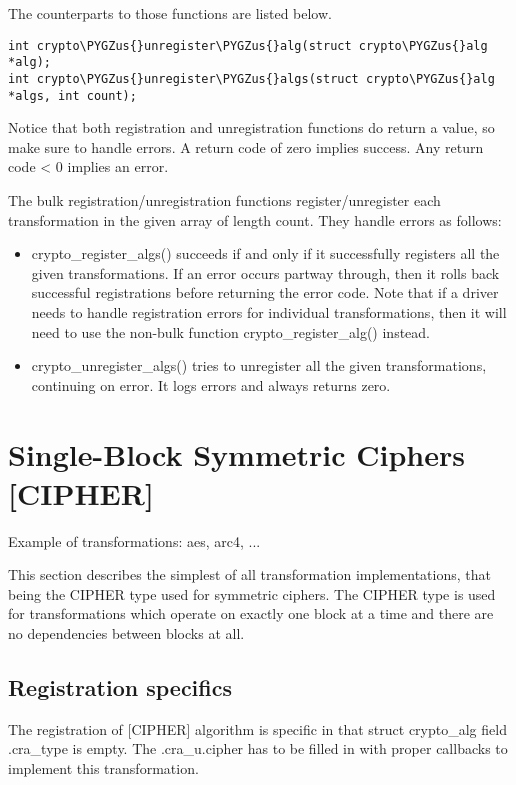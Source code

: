 \documentclass[a4paper,8pt,english]{sphinxmanual}
\def\PYGZus{\char`\_}
\begin{document}
The counterparts to those functions are listed below.

\begin{Verbatim}[commandchars=\\\{\}]
int crypto\PYGZus{}unregister\PYGZus{}alg(struct crypto\PYGZus{}alg *alg);
int crypto\PYGZus{}unregister\PYGZus{}algs(struct crypto\PYGZus{}alg *algs, int count);
\end{Verbatim}

Notice that both registration and unregistration functions do return a
value, so make sure to handle errors. A return code of zero implies
success. Any return code \textless{} 0 implies an error.

The bulk registration/unregistration functions register/unregister each
transformation in the given array of length count. They handle errors as
follows:
\begin{itemize}
\item {} 
crypto\_register\_algs() succeeds if and only if it successfully
registers all the given transformations. If an error occurs partway
through, then it rolls back successful registrations before returning
the error code. Note that if a driver needs to handle registration
errors for individual transformations, then it will need to use the
non-bulk function crypto\_register\_alg() instead.

\item {} 
crypto\_unregister\_algs() tries to unregister all the given
transformations, continuing on error. It logs errors and always
returns zero.

\end{itemize}


\section{Single-Block Symmetric Ciphers {[}CIPHER{]}}
\label{crypto/devel-algos:single-block-symmetric-ciphers-cipher}
Example of transformations: aes, arc4, ...

This section describes the simplest of all transformation
implementations, that being the CIPHER type used for symmetric ciphers.
The CIPHER type is used for transformations which operate on exactly one
block at a time and there are no dependencies between blocks at all.


\subsection{Registration specifics}
\label{crypto/devel-algos:registration-specifics}
The registration of {[}CIPHER{]} algorithm is specific in that struct
crypto\_alg field .cra\_type is empty. The .cra\_u.cipher has to be
filled in with proper callbacks to implement this transformation.
\end{document}

